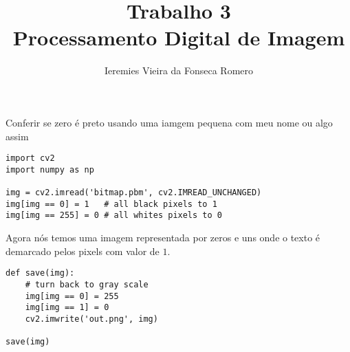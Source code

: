 \documentclass[twocolumn, 10pt]{article}
\author{Ieremies Vieira da Fonseca Romero}
\date{}
\title{Trabalho 3\\\medskip
\large Processamento Digital de Imagem}
\begin{document}
\maketitle
Conferir se zero é preto usando uma iamgem pequena com meu nome ou algo assim

\begin{verbatim}
import cv2
import numpy as np

img = cv2.imread('bitmap.pbm', cv2.IMREAD_UNCHANGED)
img[img == 0] = 1   # all black pixels to 1
img[img == 255] = 0 # all whites pixels to 0
\end{verbatim}
Agora nós temos uma imagem representada por zeros e uns onde o texto é demarcado pelos pixels com valor de \(1\).


\begin{verbatim}
def save(img):
    # turn back to gray scale
    img[img == 0] = 255
    img[img == 1] = 0
    cv2.imwrite('out.png', img)

save(img)
\end{verbatim}
\end{document}
